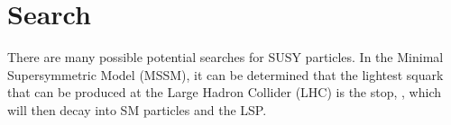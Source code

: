 \section{Search}
\label{sec:search}

There are many possible potential searches for SUSY particles. In the Minimal Supersymmetric Model (MSSM), it can be determined that the lightest squark that can be produced at the Large Hadron Collider (LHC) is the stop, \st{}, which will then decay into SM particles and the LSP. 